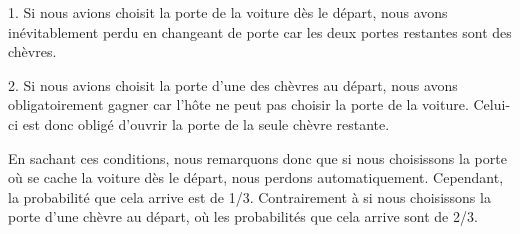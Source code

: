 \documentclass{article}
\begin{document}
 1. Si nous avions choisit la porte de la voiture dès le départ, nous avons inévitablement perdu en changeant de porte car les deux portes restantes sont des chèvres.
\newline

 2. Si nous avions choisit la porte d'une des chèvres au départ, nous avons obligatoirement gagner car l'hôte ne peut pas choisir la porte de la voiture. Celui-ci est donc obligé d'ouvrir la porte de la seule chèvre restante.

 En sachant ces conditions, nous remarquons donc que si nous choisissons la porte où se cache la voiture dès le départ, nous perdons automatiquement. Cependant, la probabilité que cela arrive est de 1/3. Contrairement à si nous choisissons la porte d'une chèvre au départ, où les probabilités que cela arrive sont de 2/3.
\end{document}
